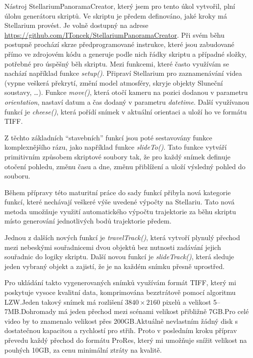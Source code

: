 \documentclass[12pt,a4paper,titlepage]{article}
\begin{document}
Nástroj StellariumPanoramaCreator, který jsem pro tento úkol vytvořil, plní úlohu generátoru skriptů. Ve skriptu je předem definováno, jaké kroky má Stellarium provést. Je volně dostupný na adrese \url{https://github.com/IToncek/StellariumPanoramaCreator}. Při svém běhu postupně prochází skrze předprogramované instrukce, které jsou zabudované přímo ve zdrojovém kódu a generuje podle nich řádky skriptu a případné složky, potřebné pro úspěšný běh skriptu. Mezi funkcemi, které často využívám se nachází například funkce \textit{setup()}. Připraví Stellarium pro zaznamenávání videa (vypne veškerá překrytí, změní model atmosféry, skryje objekty Sluneční soustavy, \ldots). Funkce \textit{move()}, která otočí kameru na pozici dodanou v parametru \textit{orientation}, nastaví datum a čas dodaný v parametru \textit{datetime}. Další využívanou funkcí je \textit{cheese()}, která pořídí snímek v aktuální orientaci a uloží ho ve formátu TIFF.%

Z těchto základních \enquote{stavebních} funkcí jsou poté sestavovány funkce komplexnějšího rázu, jako například funkce \textit{slideTo()}. Tato funkce vytváří primitivním způsobem skriptové soubory tak, že pro každý snímek definuje otočení pohledu, změnu času a dne, změnu přiblížení a uloží výsledný pohled do souboru. %

Během přípravy této maturitní práce do sady funkcí přibyla nová kategorie funkcí, které nechávají veškeré výše uvedené výpočty na Stellariu. Tato nová metoda umožňuje využití automatického výpočtu trajektorie za běhu skriptu místo generování jednotlivých bodů trajektorie předem. 

Jednou z dalších nových funkcí je \textit{travelTrack()}, která vytvoří plynulý přechod mezi nebeskými souřadnicemi dvou objektů bez nutnosti zadávání jejich souřadnic do logiky skriptu. Další novou funkcí je \textit{slideTrack()}, která sleduje jeden vybraný objekt a zajistí, že je na každém snímku přesně uprostřed. %

Pro ukládání takto vygenerovaných snímků využívám formát TIFF, který mi poskytuje vysoce kvalitní data, komprimována bezztrátově pomocí algoritmu LZW.\@ Jeden takový snímek má rozlišení \(3840\times2160\) pixelů a velikost 5--7MB.\@ Dohromady má jeden přechod mezi scénami velikost přibližně 7GB.\@ Pro celé video by to znamenalo velikost přes 200GB.\@ Aktuálně nevlastním žádný disk s dostatečnou kapacitou a rychlostí pro střih. Proto v posledním kroku příprav převedu každý přechod do formátu ProRes, který mi umožňuje snížit velikost na pouhých 10GB, za cenu minimální ztráty na kvalitě. 
\end{document}
